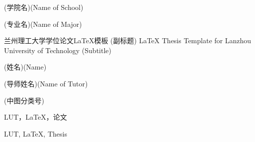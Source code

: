 
\school
{(学院名)}{(Name of School)}

\major
{(专业名)}{(Name of Major)}

\thesistitle
{兰州理工大学学位论文\LaTeX{}模板}
{(副标题)}
{\LaTeX{} Thesis Template for Lanzhou University of Technology}
{(Subtitle)}

\thesisauthor
{(姓名)}{(Name)}

\teacher
{(导师姓名)}{(Name of Tutor)}


\category
{(中图分类号)}

\keywordzh
{LUT，\LaTeX{}，论文}

\keyworden
{LUT, \LaTeX{}, Thesis}
